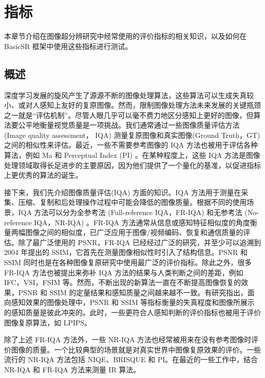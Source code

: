 \documentclass[../main.tex]{subfiles}
\begin{document}
\chapter{指标}\label{chapter:metrics}
\vspace{-2cm}

本章节介绍在图像超分辨研究中经常使用的评价指标的相关知识，以及如何在 BasicSR 框架中使用这些指标进行测试。

\section{概述}

深度学习发展的旋风产生了源源不断的图像处理算法，这些算法可以生成失真较小、或对人感知上友好的复原图像。然而，限制图像处理方法未来发展的关键瓶颈之一就是“评估机制”。尽管人眼几乎可以毫不费力地区分感知上更好的图像，但算法要公平地衡量视觉质量是一项挑战。我们通常通过一些图像质量评估方法 (Image quality assessment， IQA) 测量复原图像和真实图像(Ground Truth，GT) 之间的相似性来评估。最近，一些不需要参考图像的 IQA 方法也被用于评估各种算法，例如 Ma 和 Perceptual Index (PI) 。在某种程度上，这些 IQA 方法是图像处理领域取得长足进步的主要原因，因为他们提供了一个量化的基准，以促进指标上更优秀的算法的诞生。

接下来，我们先介绍图像质量评估(IQA) 方面的知识。IQA 方法用于测量在采集、压缩、复制和后处理操作过程中可能会降低的图像质量。根据不同的使用场景，IQA 方法可以分为全参考法 (Full-reference IQA，FR-IQA) 和无参考法 (No-reference IQA，NR-IQA) 。FR-IQA 方法通常从信息或感知特征相似度的角度衡量两幅图像之间的相似度，已广泛应用于图像/视频编码、恢复和通信质量的评估。除了最广泛使用的 PSNR，FR-IQA 已经经过广泛的研究，并至少可以追溯到 2004 年提出的 SSIM，它首先在测量图像相似性时引入了结构信息。PSNR 和 SSIM 同时也是在各种图像复原研究中使用最广泛的评价指标。除此之外，很多 FR-IQA 方法也被提出来弥补 IQA 方法的结果与人类判断之间的差距，例如 IFC，VSI，FSIM 等。然而，不断出现的新算法一直在不断提高图像恢复的效果，PSNR 和 SSIM 的定量结果和感知质量之间越来越不一致。有研究指出，面向感知效果的图像处理中，PSNR 和 SSIM 等指标衡量的失真程度和图像所展示的感知质量是彼此冲突的。此时，一些更符合人感知判断的评价指标也被用于评价图像复原算法，如 LPIPS。

除了上述 FR-IQA 方法外，一些 NR-IQA 方法也经常被用来在没有参考图像时评价图像的质量。一个比较典型的场景就是对真实世界中图像复原效果的评价。一些流行的 NR-IQA 方法包括 NIQE、BRISQUE 和 PI。在最近的一些工作中，结合 NR-IQA 和 FR-IQA 方法来测量 IR 算法。
\end{document}
